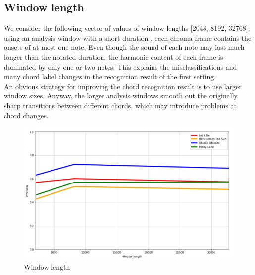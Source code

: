 \documentclass[
	12pt, %
]{fphw}
\begin{document}
\subsection*{Window length}

We consider the following vector of values of window lengths [2048, 8192, 32768]:  using an analysis window with a short duration , each chroma frame contains the onsets of at most one note. Even though the sound of each note may last much longer than the notated duration, the harmonic content of each frame is dominated by only one or two notes. This explains the misclassifications and many chord label changes in the recognition result of the first setting. \\
An obvious strategy for improving the chord recognition result is to use larger window sizes. Anyway, the larger analysis windows smooth out the originally sharp transitions between different chords, which may introduce problems at chord changes.\\

\begin{figure}[H]
 \centering
 \includegraphics[scale=1]{./images/5_window_precision.png}
 \caption{Window length}
\end{figure}

\end{document}
